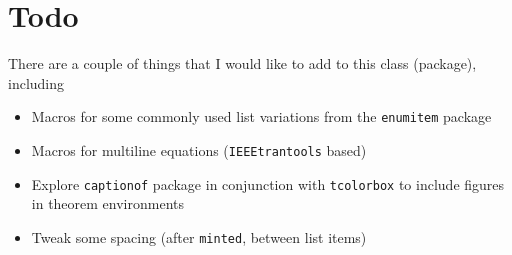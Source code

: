 \documentclass[letterpaper,11pt]{notes}
\theoremstyle{definition}
\theoremstyle{plain}
\theoremstyle{remark}
\begin{document}
\section{Todo}
There are a couple of things that I would like to add to this class (package), including
\begin{itemize}
    \item Macros for some commonly used list variations from the \texttt{enumitem} package
    \item Macros for multiline equations (\texttt{IEEEtrantools} based)
    \item Explore \texttt{captionof} package in conjunction with \texttt{tcolorbox} to include figures in theorem environments
    \item Tweak some spacing (after \texttt{minted}, between list items)
\end{itemize}
\end{document}
